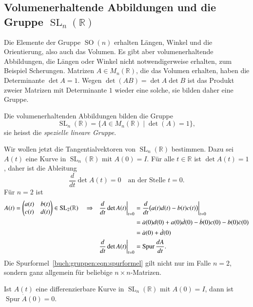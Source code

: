 %
%
\subsection{Volumenerhaltende Abbildungen und
die Gruppe $\operatorname{SL}_n(\mathbb{R})$
\label{buch:gruppen:sl}}
Die Elemente der Gruppe $\operatorname{SO}(n)$ erhalten Längen, Winkel und die
Orientierung, also auch das Volumen.
Es gibt aber volumenerhaltende Abbildungen, die Längen oder Winkel
nicht notwendigerweise erhalten, zum Beispiel Scherungen.
Matrizen $A\in M_n(\mathbb{R})$, die das Volumen erhalten,
haben die Determinante $\det A=1$.
Wegen $\det(AB)=\det A\det B$ ist das Produkt zweier Matrizen mit
Determinante $1$ wieder eine solche, sie bilden daher eine Gruppe.

\begin{definition}
Die volumenerhaltenden Abbildungen bilden die Gruppe
%
\[
\operatorname{SL}_n(\mathbb{R})
=
\{
A\in M_n(\mathbb{R})
\mid
\det (A) = 1
\},
\]
sie heisst die {\em spezielle lineare Gruppe}.
%
%
%
\end{definition}

Wir wollen jetzt die Tangentialvektoren von $\operatorname{SL}_n(\mathbb{R})$
bestimmen.
Dazu sei $A(t)$ eine Kurve in $\operatorname{SL}_n(\mathbb{R})$
mit $A(0)=I$.
Für alle $t\in\mathbb{R}$ ist $\det A(t)=1$, daher ist die Ableitung
\[
\frac{d}{dt} \det A(t) = 0
\quad\text{an der Stelle $t=0$.}
\]
Für $n=2$ ist
\begin{align}
A(t)
&=
\begin{pmatrix}
a(t)&b(t)\\
c(t)&d(t)
\end{pmatrix}
\in
\operatorname{SL}_2(\mathbb{R})
&&\Rightarrow&
\frac{d}{dt}
\det A(t)\bigg|_{t=0}
&=
\frac{d}{dt}\bigl(a(t)d(t)-b(t)c(t)\bigr)\bigg|_{t=0}
\notag
\\
&&&&
&=
\dot{a}(0) d(0)+a(0)\dot{d}(0)
-
\dot{b}(0) c(0)-b(0)\dot{c}(0)
\notag
\\
&&&&
&=
\dot{a}(0) + \dot{d}(0)
\notag
\\
&&&&
\frac{d}{dt}
\det A(t)\bigg|_{t=0}
&=
\operatorname{Spur}\frac{dA}{dt}.
\label{buch:gruppen:eqn:spurformel}
\end{align}
Die Spurformel~\eqref{buch:gruppen:eqn:spurformel}
gilt nicht nur im Falle $n=2$, sondern ganz allgemein für beliebige
$n\times n$-Matrizen.

\begin{satz}
Ist $A(t)$ eine differenzierbare Kurve in $\operatorname{SL}_n(\mathbb{R})$
mit $A(0)=I$, dann ist $\operatorname{Spur}\dot{A}(0)=0$.
\end{satz}

